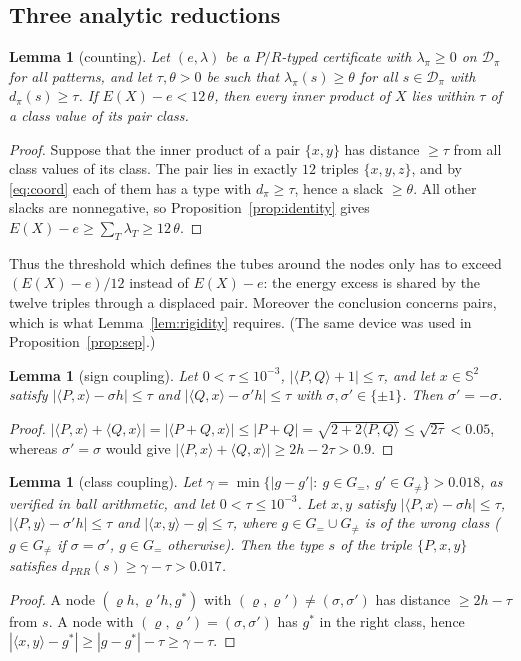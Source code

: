 \documentclass[11pt]{article}
\newtheorem{lemma}[theorem]{Lemma}
\theoremstyle{definition}
\newcommand{\Sph}{\mathbb{S}^2}
\newcommand{\ip}[2]{\langle #1,#2\rangle}
\begin{document}
\subsection{Three analytic reductions}
\begin{lemma}[counting]\label{lem:count}
Let $(e,\lambda)$ be a $P/R$-typed certificate with $\lambda_\pi\ge0$ on $\mathcal D_\pi$ for all patterns, and let
$\tau,\theta>0$ be such that $\lambda_\pi(s)\ge\theta$ for all $s\in\mathcal D_\pi$ with $d_\pi(s)\ge\tau$. If
$E(X)-e<12\,\theta$, then every inner product of $X$ lies within $\tau$ of a class value of its pair class.
\end{lemma}
\begin{proof}
Suppose that the inner product of a pair $\{x,y\}$ has distance $\ge\tau$ from all class values of its class. The pair lies
in exactly $12$ triples $\{x,y,z\}$, and by \eqref{eq:coord} each of them has a type with $d_\pi\ge\tau$, hence a slack
$\ge\theta$. All other slacks are nonnegative, so Proposition~\ref{prop:identity} gives
$E(X)-e\ge\sum_T\lambda_T\ge12\,\theta$.
\end{proof}
Thus the threshold which defines the tubes around the nodes only has to exceed $(E(X)-e)/12$ instead of $E(X)-e$: the
energy excess is shared by the twelve triples through a displaced pair. Moreover the conclusion concerns pairs, which
is what Lemma~\ref{lem:rigidity} requires. (The same device was used in Proposition~\ref{prop:sep}.)

\begin{lemma}[sign coupling]\label{lem:sign}
Let $0<\tau\le10^{-3}$, $|\ip PQ+1|\le\tau$, and let $x\in\Sph$ satisfy $|\ip Px-\sigma h|\le\tau$ and
$|\ip Qx-\sigma'h|\le\tau$ with $\sigma,\sigma'\in\{\pm1\}$. Then $\sigma'=-\sigma$.
\end{lemma}
\begin{proof}
$|\ip Px+\ip Qx|=|\ip{P+Q}{x}|\le|P+Q|=\sqrt{2+2\ip PQ}\le\sqrt{2\tau}<0.05$, whereas $\sigma'=\sigma$ would give
$|\ip Px+\ip Qx|\ge2h-2\tau>0.9$.
\end{proof}

\begin{lemma}[class coupling]\label{lem:class}
Let $\gamma=\min\{|g-g'|:\ g\in G_=,\ g'\in G_{\ne}\}>0.018$, as verified in ball arithmetic,
and let $0<\tau\le10^{-3}$. Let $x,y$
satisfy $|\ip Px-\sigma h|\le\tau$, $|\ip Py-\sigma'h|\le\tau$ and $|\ip xy-g|\le\tau$, where $g\in G_=\cup G_{\ne}$ is of
the \emph{wrong} class ($g\in G_{\ne}$ if $\sigma=\sigma'$, $g\in G_=$ otherwise). Then the type $s$ of the triple
$\{P,x,y\}$ satisfies $d_{PRR}(s)\ge\gamma-\tau>0.017$.
\end{lemma}
\begin{proof}
A node $(\varrho h,\varrho'h,g^\ast)$ with $(\varrho,\varrho')\ne(\sigma,\sigma')$ has distance $\ge2h-\tau$ from $s$. A node
with $(\varrho,\varrho')=(\sigma,\sigma')$ has $g^\ast$ in the right class, hence
$|\ip xy-g^\ast|\ge|g-g^\ast|-\tau\ge\gamma-\tau$.
\end{proof}
\end{document}
